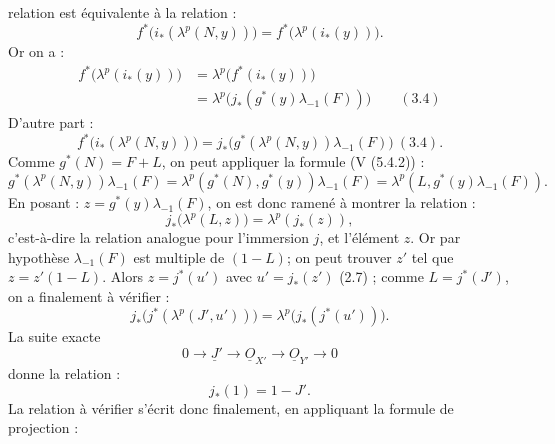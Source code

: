 
relation est équivalente à la relation :
\[
  f^*\bigl(i_*(\lambda^p(N,y))\bigr)=
  f^*\bigl(\lambda^p(i_*(y))\bigr).
\]
Or on a :
\[
\begin{aligned}
 f^*\bigl(\lambda^p(i_*(y))\bigr)
 &=\lambda^p\bigl(f^*(i_*(y))\bigr)\\
 &=\lambda^p\bigl(j_*(g^*(y)\lambda_{-1}(F))\bigr)
\qquad(3.4)
\end{aligned}
\]
D'autre part :
\[
  f^*\bigl(i_*(\lambda^p(N,y))\bigr)
  =
  j_*\bigl(g^*(\lambda^p(N,y))\lambda_{-1}(F)\bigr)\ (3.4).
\]
Comme \(g^*(N)=F+L\), on peut appliquer la formule (V (5.4.2)) :
\[
  g^*(\lambda^p(N,y))\lambda_{-1}(F)
  =
  \lambda^p(g^*(N),g^*(y))\lambda_{-1}(F)
  =
  \lambda^p(L,g^*(y)\lambda_{-1}(F)).
\]
En posant : \(z=g^*(y)\lambda_{-1}(F)\), on est donc ramené à montrer la relation :
\[
  j_*\bigl(\lambda^p(L,z)\bigr)=\lambda^p(j_*(z)),
\]
c'est-à-dire la relation analogue pour l'immersion \(j\), et l'élément \(z\). Or par hypothèse \(\lambda_{-1}(F)\) est multiple de \((1-L)\); on peut trouver \(z'\) tel que \(z=z'(1-L)\). Alors \(z=j^*(u')\) avec \(u'=j_*(z')\) (2.7) ; comme \(L=j^*(J')\), on a finalement à vérifier :
\[
  j_*\bigl(j^*(\lambda^p(J',u'))\bigr)=
  \lambda^p\bigl(j_*(j^*(u'))\bigr).
\]
La suite exacte
\[
  0\longrightarrow \underline{J}'\longrightarrow \underline{O}_{X'}
  \longrightarrow \underline{O}_{Y'}\longrightarrow 0
\]
donne la relation :
\begin{equation}\tag{4.3.2}
  j_*(1)=1-J'.
\end{equation}
La relation à vérifier s'écrit donc finalement, en appliquant la formule de
projection :
